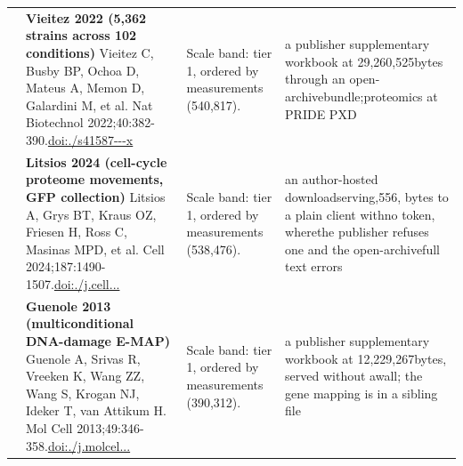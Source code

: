 \begin{landscape}
\begin{longtable}{@{}r@{\hspace{4pt}} L{78mm} L{72mm} L{76mm}@{}}
 & \textbf{Vieitez 2022 (5,362 strains across 102 conditions)} \newline Vieitez C, Busby BP, Ochoa D, Mateus A, Memon D, Galardini M, et al. Nat Biotechnol 2022;40:382-390.\newline \href{https://doi.org/10.1038/s41587-021-01051-x}{doi:./\allowbreak s41587---\allowbreak x} & Scale band: tier 1, ordered by measurements (540,817). & a publis\allowbreak her supp\allowbreak lementar\allowbreak y workbo\allowbreak ok at 29\allowbreak ,260,525\allowbreak  bytes t\allowbreak hrough a\allowbreak n open-\allowbreak archive\allowbreak  bundle;\allowbreak  proteom\allowbreak ics at P\allowbreak RIDE PXD \\
 & \textbf{Litsios 2024 (cell-cycle proteome movements, GFP collection)} \newline Litsios A, Grys BT, Kraus OZ, Friesen H, Ross C, Masinas MPD, et al. Cell 2024;187:1490-1507.\newline \href{https://doi.org/10.1016/j.cell.2024.02.014}{doi:./\allowbreak j.\allowbreak cell...} & Scale band: tier 1, ordered by measurements (538,476). & an autho\allowbreak r-\allowbreak hosted \allowbreak download\allowbreak  serving,556, byte\allowbreak s to a p\allowbreak lain cli\allowbreak ent with\allowbreak  no toke\allowbreak n, where\allowbreak  the pub\allowbreak lisher r\allowbreak efuses o\allowbreak ne and t\allowbreak he open-\allowbreak archive\allowbreak  full te\allowbreak xt error\allowbreak s \\
 & \textbf{Guenole 2013 (multiconditional DNA-damage E-MAP)} \newline Guenole A, Srivas R, Vreeken K, Wang ZZ, Wang S, Krogan NJ, Ideker T, van Attikum H. Mol Cell 2013;49:346-358.\newline \href{https://doi.org/10.1016/j.molcel.2012.11.023}{doi:./\allowbreak j.\allowbreak molcel...} & Scale band: tier 1, ordered by measurements (390,312). & a publis\allowbreak her supp\allowbreak lementar\allowbreak y workbo\allowbreak ok at 12\allowbreak ,229,267\allowbreak  bytes, \allowbreak served w\allowbreak ithout a\allowbreak  wall; t\allowbreak he gene \allowbreak mapping \allowbreak is in a \allowbreak sibling \allowbreak file \\

\end{longtable}
\end{landscape}
